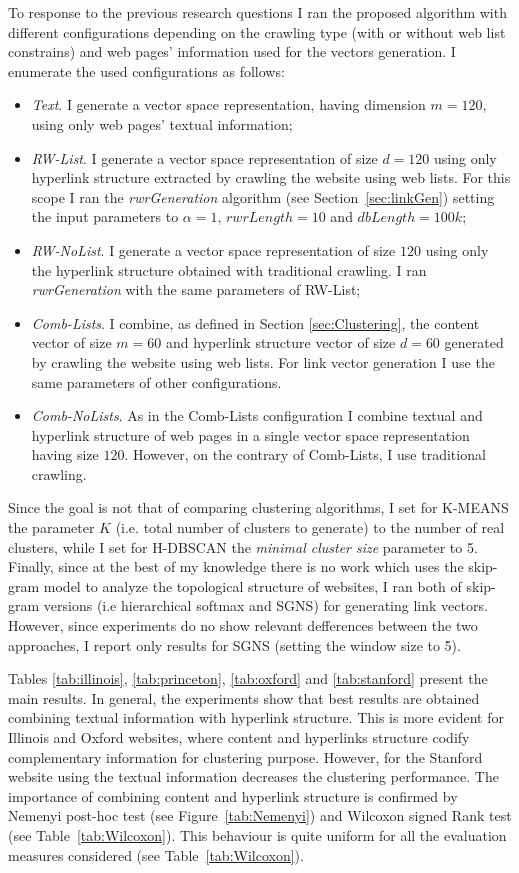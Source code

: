 To response to the previous research questions I ran the proposed algorithm with different configurations depending on the crawling type (with or without web list constrains) and web pages' information used for the vectors generation. I enumerate the used configurations as follows: 
\begin{itemize}
\item \textit{Text}. I generate a vector space representation, having dimension $m=120$, using only web pages' textual information;
\item \textit{RW-List}. I generate a vector space representation of size $d=120$ using only hyperlink structure extracted by crawling the website using web lists. For this scope I ran the \emph{rwrGeneration} algorithm (see Section~\ref{sec:linkGen}) setting the input parameters to $\alpha = 1$, $rwrLength = 10$ and $dbLength = 100k$;
\item \textit{RW-NoList}. I generate a vector space representation of size $120$ using only the hyperlink structure obtained with traditional crawling. I ran  \emph{rwrGeneration}  with the same parameters of RW-List;
\item \textit{Comb-Lists}. I combine, as defined in Section \ref{sec:Clustering}, the content vector of size $m=60$ and hyperlink structure vector of size $d=60$ generated by crawling the website using web lists. For link vector generation I use the same parameters of other configurations.      
\item \textit{Comb-NoLists}. As in the Comb-Lists configuration I combine textual  and  hyperlink  structure of web pages in a single vector space representation having size $120$. However, on the contrary of Comb-Lists, I use traditional crawling.
\end{itemize}
Since the goal is not that of comparing clustering algorithms, I set for K-MEANS the parameter $K$ (i.e. total number of clusters to generate) to the number of real clusters, while I set for H-DBSCAN the \emph{minimal cluster size} parameter to 5. Finally, since at the best of my knowledge there is no work which uses the skip-gram model to analyze the topological structure of websites, I ran both of skip-gram versions (i.e hierarchical softmax and SGNS) for generating link vectors. However, since experiments do no show relevant defferences between the two approaches, I report only results for SGNS (setting the window size to 5).


Tables \ref{tab:illinois}, \ref{tab:princeton}, \ref{tab:oxford} and \ref{tab:stanford} present the main results. In general, the experiments show that best results are obtained combining textual information with hyperlink structure. This is more evident for Illinois and Oxford websites, where content and hyperlinks structure codify complementary information for clustering purpose. However, for the Stanford website using the textual information decreases the clustering performance.
The importance of combining content and hyperlink structure is confirmed by Nemenyi post-hoc test (see Figure~\ref{tab:Nemenyi}) and Wilcoxon signed Rank test (see Table~\ref{tab:Wilcoxon}). This behaviour is quite uniform for all the evaluation measures considered (see Table~\ref{tab:Wilcoxon}). 

